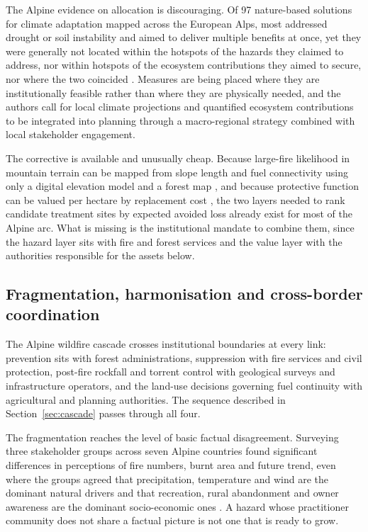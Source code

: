 \documentclass[11pt,a4paper]{article}
\begin{document}
The Alpine evidence on allocation is discouraging. Of 97 nature-based solutions for climate adaptation mapped across the European Alps, most addressed drought or soil instability and aimed to deliver multiple benefits at once, yet they were generally not located within the hotspots of the hazards they claimed to address, nor within hotspots of the ecosystem contributions they aimed to secure, nor where the two coincided \citep{dubo_nature-based_2023}. Measures are being placed where they are institutionally feasible rather than where they are physically needed, and the authors call for local climate projections and quantified ecosystem contributions to be integrated into planning through a macro-regional strategy combined with local stakeholder engagement.

The corrective is available and unusually cheap. Because large-fire likelihood in mountain terrain can be mapped from slope length and fuel connectivity using only a digital elevation model and a forest map \citep{conedera_linking_2024}, and because protective function can be valued per hectare by replacement cost \citep{accastello_asforesee_2019}, the two layers needed to rank candidate treatment sites by expected avoided loss already exist for most of the Alpine arc. What is missing is the institutional mandate to combine them, since the hazard layer sits with fire and forest services and the value layer with the authorities responsible for the assets below.

\subsection{Fragmentation, harmonisation and cross-border coordination}

The Alpine wildfire cascade crosses institutional boundaries at every link: prevention sits with forest administrations, suppression with fire services and civil protection, post-fire rockfall and torrent control with geological surveys and infrastructure operators, and the land-use decisions governing fuel continuity with agricultural and planning authorities. The sequence described in Section~\ref{sec:cascade} passes through all four.

The fragmentation reaches the level of basic factual disagreement. Surveying three stakeholder groups across seven Alpine countries found significant differences in perceptions of fire numbers, burnt area and future trend, even where the groups agreed that precipitation, temperature and wind are the dominant natural drivers and that recreation, rural abandonment and owner awareness are the dominant socio-economic ones \citep{hoang_stakeholders_2026}. A hazard whose practitioner community does not share a factual picture is not one that is ready to grow.
\end{document}
